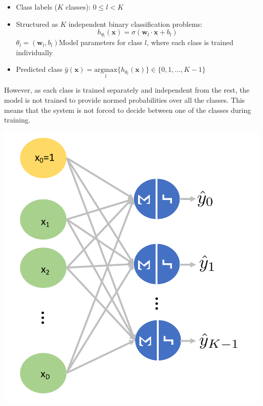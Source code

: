 \documentclass[11pt]{article}
\begin{document}
\begin{minipage}{0.7\linewidth}
	\begin{itemize}[label=, leftmargin=*]
		\item Class labels ($K$ classes): $0\leq l < K$
		\item Structured as $K$ independent binary classification problems:\\
		$$ h_{\theta_l}(\textbf{x}) = \sigma(\textbf{w}_l\cdot\textbf{x} + b_l) $$
		$\theta_l = (\textbf{w}_l, b_l)$\quad Model parameters for class $l$, where each class is trained individually
		\item Predicted class $ \widehat{y}(\textbf{x}) = \underset{l}{\text{argmax}}\{h_{\theta_l}(\textbf{x})\} \in \{0,1,...,K-1\}$
	\end{itemize}
	
	However, as each class is trained separately and independent from the rest, the model is not trained to provide normed probabilities over all the classes. This means that the system is not forced to decide between one of the classes during training.
\end{minipage}
\begin{minipage}{0.3\linewidth}
	\centering
	\includegraphics[width=\linewidth]{multiple_binary_classes}
\end{minipage}
\end{document}
